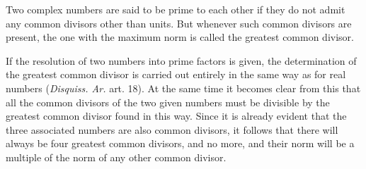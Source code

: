 \documentclass[twoside,12pt]{memoir}
\begin{document}
Two complex numbers are said to be prime to each other if they do not admit any common divisors other than units. But whenever such common divisors are present, the one with the maximum norm is called the greatest common divisor.

If the resolution of two numbers into prime factors is given, the determination of the greatest common divisor is carried out entirely in the same way as for real numbers (\textit{Disquiss. Ar.} art. 18). At the same time it becomes clear from this that all the common divisors of the two given numbers must be divisible by the greatest common divisor found in this way.  Since it is already evident that the three associated numbers are also common divisors, it follows that there will always be four greatest common divisors, and no more, \pagebreak%
and their norm will be a multiple of the norm of any other common divisor.
\end{document}
